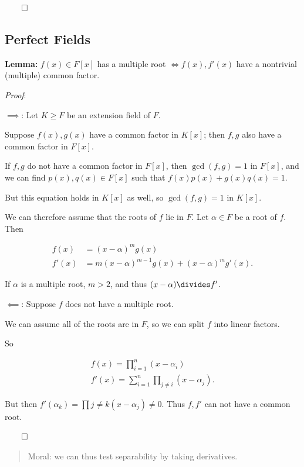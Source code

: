 \(\qed\)

\hypertarget{perfect-fields}{%
\subsection{Perfect Fields}\label{perfect-fields}}

\textbf{Lemma:} \(f(x) \in F[x]\) has a multiple root
\(\iff f(x), f'(x)\) have a nontrivial (multiple) common factor.

\emph{Proof}:

\(\implies\): Let \(K\geq F\) be an extension field of \(F\).

Suppose \(f(x), g(x)\) have a common factor in \(K[x]\); then \(f,g\)
also have a common factor in \(F[x]\).

If \(f, g\) do not have a common factor in \(F[x]\), then
\(\gcd(f, g) = 1\) in \(F[x]\), and we can find \(p(x), q(x) \in F[x]\)
such that \(f(x)p(x) + g(x)q(x) = 1\).

But this equation holds in \(K[x]\) as well, so \(\gcd(f, g) = 1\) in
\(K[x]\).

We can therefore assume that the roots of \(f\) lie in \(F\). Let
\(\alpha\in F\) be a root of \(f\). Then

\begin{align*}
f(x)  &= (x-\alpha)^m g(x) \\
f'(x) &= m(x-\alpha)^{m-1} g(x) + (x-\alpha)^m g'(x)
.\end{align*}

If \(\alpha\) is a multiple root, \(m > 2\), and thus
\((x-\alpha) \divides f'\).

\(\impliedby\): Suppose \(f\) does not have a multiple root.

We can assume all of the roots are in \(F\), so we can split \(f\) into
linear factors.

So

\begin{align*}
f(x) = \prod_{i=1}^n (x-\alpha_i) \\
f'(x) = \sum_{i=1}^n \prod_{j\neq i} (x-\alpha_j)
.\end{align*}

But then \(f'(\alpha_k) = \prod{j\neq k} (x - \alpha_j) \neq 0\). Thus
\(f, f'\) can not have a common root.

\(\qed\)

\begin{quote}
Moral: we can thus test separability by taking derivatives.
\end{quote}

